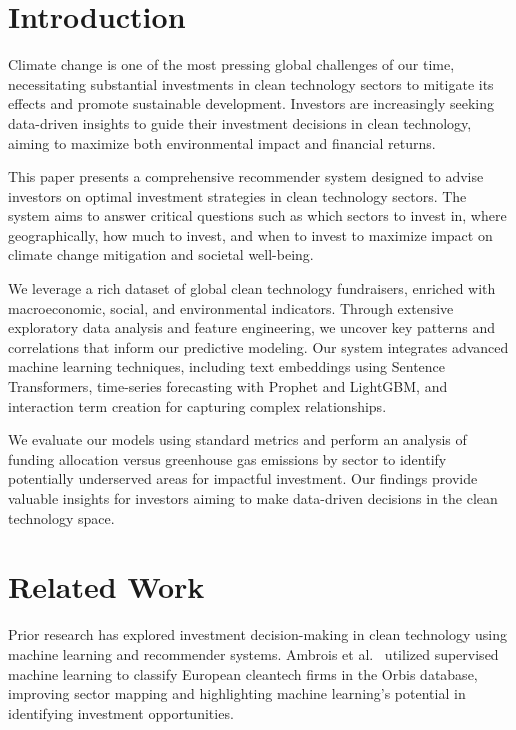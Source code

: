 \documentclass[sigconf]{acmart}
\begin{document}

\maketitle

\section{Introduction}

Climate change is one of the most pressing global challenges of our time, necessitating substantial investments in clean technology sectors to mitigate its effects and promote sustainable development. Investors are increasingly seeking data-driven insights to guide their investment decisions in clean technology, aiming to maximize both environmental impact and financial returns.

This paper presents a comprehensive recommender system designed to advise investors on optimal investment strategies in clean technology sectors. The system aims to answer critical questions such as which sectors to invest in, where geographically, how much to invest, and when to invest to maximize impact on climate change mitigation and societal well-being.

We leverage a rich dataset of global clean technology fundraisers, enriched with macroeconomic, social, and environmental indicators. Through extensive exploratory data analysis and feature engineering, we uncover key patterns and correlations that inform our predictive modeling. Our system integrates advanced machine learning techniques, including text embeddings using Sentence Transformers, time-series forecasting with Prophet and LightGBM, and interaction term creation for capturing complex relationships.

We evaluate our models using standard metrics and perform an analysis of funding allocation versus greenhouse gas emissions by sector to identify potentially underserved areas for impactful investment. Our findings provide valuable insights for investors aiming to make data-driven decisions in the clean technology space.

\section{Related Work}

Prior research has explored investment decision-making in clean technology using machine learning and recommender systems. Ambrois et al.~\cite{KraemerEisBotsariLangPal2023} utilized supervised machine learning to classify European cleantech firms in the Orbis database, improving sector mapping and highlighting machine learning's potential in identifying investment opportunities.
\end{document}
